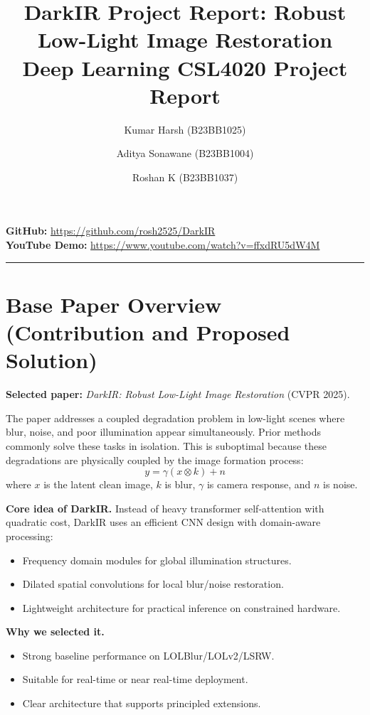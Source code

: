 \documentclass[10pt,twocolumn]{article}
\title{DarkIR Project Report: Robust Low-Light Image Restoration\\
\large Deep Learning CSL4020 Project Report}
\author{Kumar Harsh (B23BB1025) \and Aditya Sonawane (B23BB1004) \and Roshan K (B23BB1037)}
\date{}
\begin{document}
\maketitle

\textbf{GitHub:} \url{https://github.com/rosh2525/DarkIR}\\
\textbf{YouTube Demo:} \url{https://www.youtube.com/watch?v=ffxdRU5dW4M}

\vspace{0.2cm}
\hrule
\vspace{0.2cm}

\section{Base Paper Overview (Contribution and Proposed Solution)}

\textbf{Selected paper:} \emph{DarkIR: Robust Low-Light Image Restoration} (CVPR 2025).

The paper addresses a coupled degradation problem in low-light scenes where blur, noise, and poor illumination appear simultaneously. Prior methods commonly solve these tasks in isolation. This is suboptimal because these degradations are physically coupled by the image formation process:
\begin{equation}
  y = \gamma(x \otimes k) + n
\end{equation}
where $x$ is the latent clean image, $k$ is blur, $\gamma$ is camera response, and $n$ is noise.

\textbf{Core idea of DarkIR.} Instead of heavy transformer self-attention with quadratic cost, DarkIR uses an efficient CNN design with domain-aware processing:
\begin{itemize}
  \item Frequency domain modules for global illumination structures.
  \item Dilated spatial convolutions for local blur/noise restoration.
  \item Lightweight architecture for practical inference on constrained hardware.
\end{itemize}

\textbf{Why we selected it.}
\begin{itemize}
  \item Strong baseline performance on LOLBlur/LOLv2/LSRW.
  \item Suitable for real-time or near real-time deployment.
  \item Clear architecture that supports principled extensions.
\end{itemize}
\end{document}
